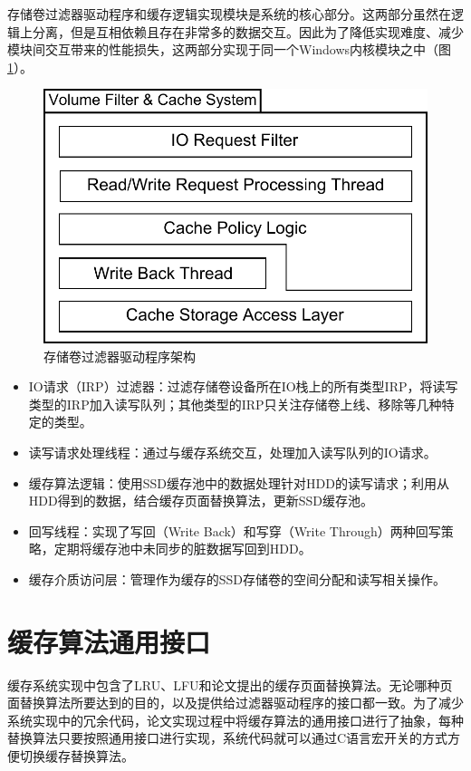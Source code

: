 存储卷过滤器驱动程序和缓存逻辑实现模块是系统的核心部分。这两部分虽然在逻辑上分离，但是互相依赖且存在非常多的数据交互。因此为了降低实现难度、减少模块间交互带来的性能损失，这两部分实现于同一个Windows内核模块之中（图\ref{fig:sys-flt-arch}）。

\begin{figure}[H]
\centering
\includegraphics[width=0.6\linewidth]{./graph/sys-flt-arch}
\caption{存储卷过滤器驱动程序架构}
\label{fig:sys-flt-arch}
\end{figure}

\begin{itemize}
\item
IO请求（IRP）过滤器：过滤存储卷设备所在IO栈上的所有类型IRP，将读写类型的IRP加入读写队列；其他类型的IRP只关注存储卷上线、移除等几种特定的类型。
\item
读写请求处理线程：通过与缓存系统交互，处理加入读写队列的IO请求。
\item
缓存算法逻辑：使用SSD缓存池中的数据处理针对HDD的读写请求；利用从HDD得到的数据，结合缓存页面替换算法，更新SSD缓存池。
\item
回写线程：实现了写回（Write Back）和写穿（Write Through）两种回写策略，定期将缓存池中未同步的脏数据写回到HDD。
\item
缓存介质访问层：管理作为缓存的SSD存储卷的空间分配和读写相关操作。
\end{itemize}


\section{缓存算法通用接口}
\label{sec:cache_interface}

缓存系统实现中包含了LRU、LFU和论文提出的缓存页面替换算法。无论哪种页面替换算法所要达到的目的，以及提供给过滤器驱动程序的接口都一致。为了减少系统实现中的冗余代码，论文实现过程中将缓存算法的通用接口进行了抽象，每种替换算法只要按照通用接口进行实现，系统代码就可以通过C语言宏开关的方式方便切换缓存替换算法。

